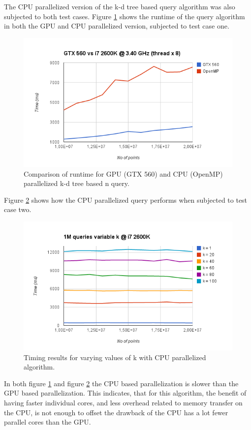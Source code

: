 The CPU parallelized version of the k-d tree based query algorithm was also subjected to both test cases. Figure \ref{fig:v17-gpu-vs-cpu} shows the runtime of the query algorithm in both the GPU and CPU parallelized version, subjected to test case one.

\begin{figure}[ht!]
    \centering
    \includegraphics[width=120mm]{../gfx/v17-gpu-vs-cpu.png}
    \caption{Comparison of runtime for GPU (GTX 560) and CPU (OpenMP) parallelized k-d tree based n query.}
    \label{fig:v17-gpu-vs-cpu}
\end{figure}

Figure \ref{fig:v17-cpu-variable-k} shows how the CPU parallelized query performs when subjected to test case two.

\begin{figure}[ht!]
    \centering
    \includegraphics[width=120mm]{../gfx/v17-cpu-variable-k.png}
    \caption{Timing results for varying values of k with CPU parallelized algorithm.}
    \label{fig:v17-cpu-variable-k}
\end{figure}

In both figure \ref{fig:v17-gpu-vs-cpu} and figure \ref{fig:v17-cpu-variable-k} the CPU based parallelization is slower than the GPU based parallelization. This indicates, that for this algorithm, the benefit of having faster individual cores, and less overhead related to memory transfer on the CPU, is not enough to offset the drawback of the CPU has a lot fewer parallel cores than the GPU.

